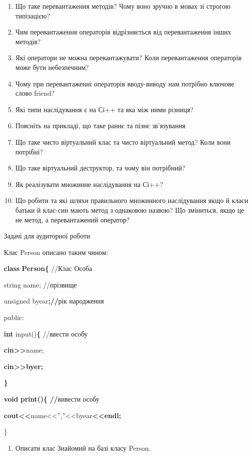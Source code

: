 \documentclass[]{article}
\makeatletter
\newcommand{\xslalph}[1]{\expandafter\@xslalph\csname c@#1\endcsname}
\newcommand{\@xslalph}[1]{%
    \ifcase#1\or а\or б\or в\or г\or д\or e\or є\or ж\or з\or i%
    \or й\or к\or л\or м\or н\or о\or п\or р\or с\or т%
    \or у\or ф\or х\or ц\or ч\or ш\or ю\or я\or аа\or бб\or вв%
    \else\@ctrerr\fi%
}
\makeatother
\begin{document}
\begin{enumerate}
\begin{enumerate}[label=\xslalph*)]
\begin{enumerate}
\begin{enumerate}[label=\xslalph*)]
\begin{enumerate}
\def\labelenumi{\arabic{enumi})}
\item
  Що таке перевантаження методів? Чому воно зручно в мовах зі строгою
  типізацією?
\item
  Чим перевантаження операторів відрізняється від перевантаження інших
  методів?
\item
  Які оператори не можна перевантажувати? Коли перевантаження операторів
  може бути небезпечним?
\item
  Чому при перевантаженні операторів вводу-виводу нам потрібно ключове
  слово friend?
\item
  Які типи наслідування є на Сі++ та яка між ними різниця?
\item
  Поясніть на прикладі, що таке раннє та пізнє зв'язування
\item
  Що таке чисто віртуальний клас та чисто віртуальний метод? Коли вони
  потрібні?
\item
  Що таке віртуальний деструктор, та чому він потрібний?
\item
  Як реалізувати множинне наслідування на Сі++?
\item
  Що робити та які шляхи правильного множинного наслідування якщо й
  класи батьки й клас-син мають метод з однаковою назвою? Що зміниться,
  якщо це не метод, а перевантажений оператор?
\end{enumerate}

Задачі для аудиторної роботи

Клас Person описано таким чином:

\textbf{class} \textbf{Person\{} //Клас Особа

string name; //прізвище

unsigned byear\textbf{;//}рік народження

public:

\textbf{int} input()\textbf{\{} //ввести особу

\textbf{cin\textgreater{}\textgreater{}}name;

\textbf{cin\textgreater{}\textgreater{}byer;}

\textbf{\}}

\textbf{void} \textbf{print()\{ //}вивести особу

\textbf{cout\textless{}\textless{}}name\textless{}\textless{}'',''\textless{}\textless{}byear\textbf{\textless{}\textless{}endl;}

\}

\begin{enumerate}
\def\labelenumi{\arabic{enumi})}
\item
  Описати клас Знайомий на базі класу Person.
\end{enumerate}


\end{enumerate}
\end{enumerate}
\end{enumerate}
\end{enumerate}
\end{document}
